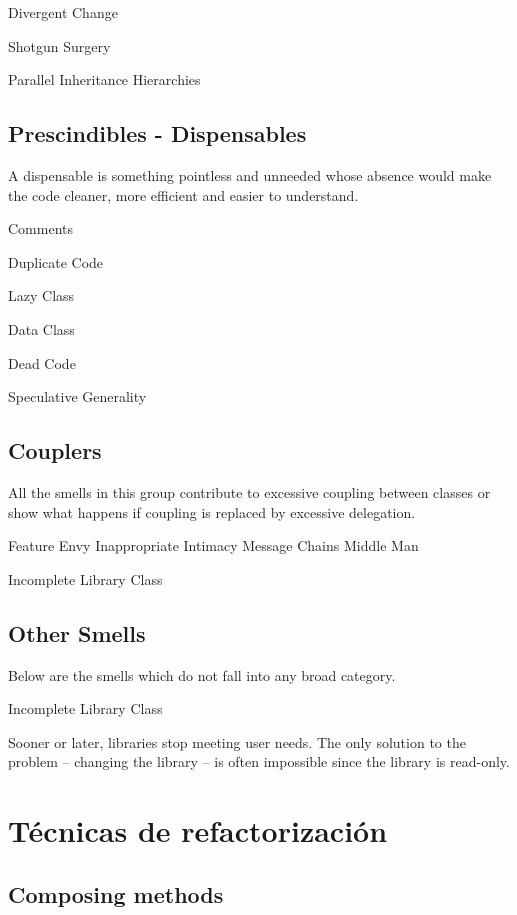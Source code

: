 \documentclass[11pt,a4paper,oneside]{book}
\begin{document}
    Divergent Change
    
    Shotgun Surgery

    Parallel Inheritance Hierarchies




\section{Prescindibles - Dispensables}

A dispensable is something pointless and unneeded whose absence would make the code cleaner, more efficient and easier to understand.

    Comments
    
    Duplicate Code
    
    Lazy Class

    Data Class

Dead Code

    Speculative Generality



\section{Couplers}

All the smells in this group contribute to excessive coupling between classes or show what happens if coupling is replaced by excessive delegation.

    Feature Envy
    Inappropriate Intimacy
    Message Chains
    Middle Man

    Incomplete Library Class


\section{Other Smells}

Below are the smells which do not fall into any broad category.

Incomplete Library Class

Sooner or later, libraries stop meeting user needs. The only solution to the problem – changing the library – is often impossible since the library is read-only.



\chapter{Técnicas de refactorización}


\section{Composing methods}
\end{document}
